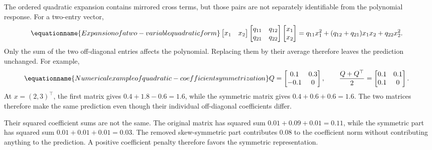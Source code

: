 The ordered quadratic expansion contains mirrored cross terms, but those pairs are not separately identifiable from the polynomial response. For a two-entry vector,
\begin{equation}
\equationname{Expansion of a two-variable quadratic form}
\label{eq:icsor_scalar_quadratic}
\begin{bmatrix}x_1&x_2\end{bmatrix}
\begin{bmatrix}q_{11}&q_{12}\\q_{21}&q_{22}\end{bmatrix}
\begin{bmatrix}x_1\\x_2\end{bmatrix}
=q_{11}x_1^2+(q_{12}+q_{21})x_1x_2+q_{22}x_2^2.
\end{equation}
Only the sum of the two off-diagonal entries affects the polynomial. Replacing them by their average therefore leaves the prediction unchanged. For example,
\begin{equation}
\equationname{Numerical example of quadratic-coefficient symmetrization}
\label{eq:icsor_symmetry_numbers}
Q=\begin{bmatrix}0.1&0.3\\-0.1&0\end{bmatrix},
\qquad
\frac{Q+Q^\top}{2}=\begin{bmatrix}0.1&0.1\\0.1&0\end{bmatrix}.
\end{equation}
At \(x=(2,3)^\top\), the first matrix gives \(0.4+1.8-0.6=1.6\), while the symmetric matrix gives \(0.4+0.6+0.6=1.6\). The two matrices therefore make the same prediction even though their individual off-diagonal coefficients differ.

Their squared coefficient sums are not the same. The original matrix has squared sum \(0.01+0.09+0.01=0.11\), while the symmetric part has squared sum \(0.01+0.01+0.01=0.03\). The removed skew-symmetric part contributes 0.08 to the coefficient norm without contributing anything to the prediction. A positive coefficient penalty therefore favors the symmetric representation.

